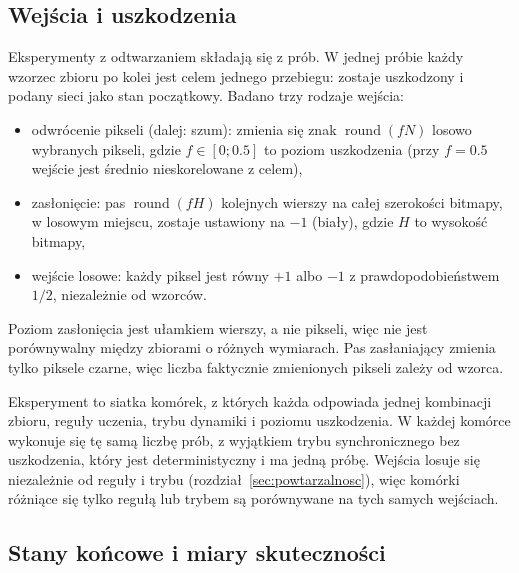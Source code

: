 \subsection{Wejścia i uszkodzenia}
\label{sec:uszkodzenia}

Eksperymenty z odtwarzaniem składają się z prób. W jednej próbie każdy wzorzec zbioru po kolei jest celem jednego przebiegu: zostaje uszkodzony i podany sieci jako stan początkowy. Badano trzy rodzaje wejścia:
\begin{itemize}
    \item odwrócenie pikseli (dalej: szum): zmienia się znak $\operatorname{round}(fN)$ losowo wybranych pikseli, gdzie $f \in [0; \num{0.5}]$ to poziom uszkodzenia (przy $f = \num{0.5}$ wejście jest średnio nieskorelowane z celem),
    \item zasłonięcie: pas $\operatorname{round}(fH)$ kolejnych wierszy na całej szerokości bitmapy, w losowym miejscu, zostaje ustawiony na $-1$ (biały), gdzie $H$ to wysokość bitmapy,
    \item wejście losowe: każdy piksel jest równy $+1$ albo $-1$ z prawdopodobieństwem $1/2$, niezależnie od wzorców.
\end{itemize}
Poziom zasłonięcia jest ułamkiem wierszy, a nie pikseli, więc nie jest porównywalny między zbiorami o różnych wymiarach. Pas zasłaniający zmienia tylko piksele czarne, więc liczba faktycznie zmienionych pikseli zależy od wzorca.

Eksperyment to siatka komórek, z których każda odpowiada jednej kombinacji zbioru, reguły uczenia, trybu dynamiki i poziomu uszkodzenia. W każdej komórce wykonuje się tę samą liczbę prób, z wyjątkiem trybu synchronicznego bez uszkodzenia, który jest deterministyczny i ma jedną próbę. Wejścia losuje się niezależnie od reguły i trybu (rozdział~\ref{sec:powtarzalnosc}), więc komórki różniące się tylko regułą lub trybem są porównywane na tych samych wejściach.

\subsection{Stany końcowe i miary skuteczności}
\label{sec:metryki}

